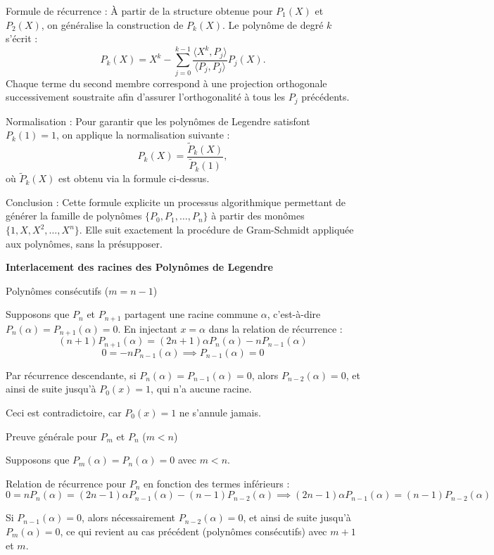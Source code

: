 \documentclass[10pt,a4paper]{article}
\begin{document}
Formule de récurrence : À partir de la structure obtenue pour \( P_1(X) \) et \( P_2(X) \), on
généralise la construction de \( P_k(X) \).
Le polynôme de degré \( k \) s'écrit :
\[
P_k(X) = X^k - \sum_{j=0}^{k-1} \frac{\langle X^k, P_j \rangle}{\langle P_j, P_j \rangle} P_j(X).
\]
Chaque terme du second membre correspond à une projection orthogonale successivement soustraite afin
d'assurer l'orthogonalité à tous les \( P_j \) précédents.

Normalisation : Pour garantir que les polynômes de Legendre satisfont \( P_k(1) = 1 \), on applique
la normalisation suivante :
\[
P_k(X) = \frac{\widetilde{P}_k(X)}{\widetilde{P}_k(1)},
\]
où \( \widetilde{P}_k(X) \) est obtenu via la formule ci-dessus.

Conclusion : Cette formule explicite un processus algorithmique permettant de générer la famille de
polynômes \( \{P_0, P_1, \dots, P_n\} \) à partir des monômes \( \{1, X, X^2, \dots, X^n\} \). Elle
suit exactement la procédure de Gram-Schmidt appliquée aux polynômes, sans la présupposer.


\bigskip
\textbf{Interlacement des racines des Polynômes de Legendre}

\q Polynômes consécutifs ($m = n-1$)

Supposons que $ P_{n} $ et $ P_{n+1} $ partagent une racine commune $ \alpha $, c'est-à-dire $
P_n(\alpha) = P_{n+1}(\alpha) = 0 $. En injectant $ x = \alpha $ dans la relation de récurrence :
$$
(n+1)P_{n+1}(\alpha) = (2n+1)\alpha P_n(\alpha) - nP_{n-1}(\alpha)
$$
$$
0 = -nP_{n-1}(\alpha) \implies P_{n-1}(\alpha) = 0
$$

Par récurrence descendante, si $ P_{n}(\alpha) = P_{n-1}(\alpha) = 0 $, alors $ P_{n-2}(\alpha) = 0
$, et ainsi de suite jusqu'à $ P_0(x) = 1 $, qui n'a aucune racine.

Ceci est contradictoire, car $ P_0(x) = 1 $ ne s'annule jamais.

\q Preuve générale pour $ P_m $ et $ P_n $ ($ m < n $)

Supposons que $P_m(\alpha) = P_n(\alpha) = 0$ avec $m < n$.

Relation de récurrence pour $P_n$ en fonction des termes inférieurs :
$$0 = n P_n(\alpha) = (2n-1)\alpha P_{n-1}(\alpha) - (n-1)P_{n-2}(\alpha) \implies (2n-1)\alpha P_{n-1}(\alpha) = (n-1)P_{n-2}(\alpha)$$

Si $P_{n-1}(\alpha) = 0$, alors nécessairement $P_{n-2}(\alpha) = 0$, et ainsi de suite jusqu'à
$P_m(\alpha) = 0$, ce qui revient au cas précédent (polynômes consécutifs) avec $m + 1$ et $m$.
\end{document}
